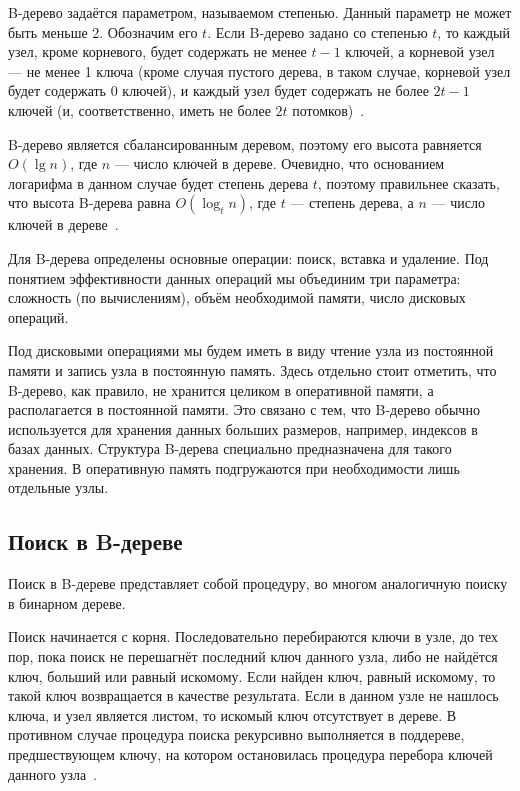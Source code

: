 \documentclass[a4paper,12pt]{article}
\begin{document}
	B-дерево задаётся параметром, называемом степенью. Данный параметр не может быть меньше 2. Обозначим его $t$. Если B-дерево задано со степенью $t$, то каждый узел, кроме корневого, будет содержать не менее $t-1$ ключей, а корневой узел --- не менее 1 ключа (кроме случая пустого дерева, в таком случае, корневой узел будет содержать 0 ключей), и каждый узел будет содержать не более $2t-1$ ключей (и, соответственно, иметь не более $2t$ потомков)~\cite{Kormen}.
	
	B-дерево является сбалансированным деревом, поэтому его высота равняется $O(\lg n)$, где $n$ --- число ключей в дереве. Очевидно, что основанием логарифма в данном случае будет степень дерева $t$, поэтому правильнее сказать, что высота B-дерева равна $O(\log_t n)$, где $t$ --- степень дерева, а $n$ --- число ключей в дереве~\cite{Kormen}.
	
	Для B-дерева определены основные операции: поиск, вставка и удаление. Под понятием эффективности данных операций мы объединим три параметра: сложность (по вычислениям), объём необходимой памяти, число дисковых операций.
	
	Под дисковыми операциями мы будем иметь в виду чтение узла из постоянной памяти и запись узла в постоянную память. Здесь отдельно стоит отметить, что B-дерево, как правило, не хранится целиком в оперативной памяти, а располагается в постоянной памяти. Это связано с тем, что B-дерево обычно используется для хранения данных больших размеров, например, индексов в базах данных. Структура B-дерева специально предназначена для такого хранения. В оперативную память подгружаются при необходимости лишь отдельные узлы.
	
	\subsection{Поиск в B-дереве}
	
	Поиск в B-дереве представляет собой процедуру, во многом аналогичную поиску в бинарном дереве.
	
	Поиск начинается с корня. Последовательно перебираются ключи в узле, до тех пор, пока поиск не перешагнёт последний ключ данного узла, либо не найдётся ключ, больший или равный искомому. Если найден ключ, равный искомому, то такой ключ возвращается в качестве результата. Если в данном узле не нашлось ключа, и узел является листом, то искомый ключ отсутствует в дереве. В противном случае процедура поиска рекурсивно выполняется в поддереве, предшествующем ключу, на котором остановилась процедура перебора ключей данного узла~\cite{Kormen}.
	
\end{document}
